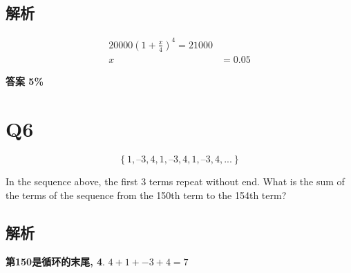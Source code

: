   \subsection{解析}

    \begin{align*}
      20000 \left( 1 + \frac{x}{4} \right)^{4} = 21000 \\
      x &= 0.05
    \end{align*}

    \textbf{答案 5\%}

\section{Q6}

  \begin{equation*}
    \left\{1, –3, 4, 1, –3, 4, 1, –3, 4, ...\right\}
  \end{equation*}

  In the sequence above, the first 3 terms repeat without end. What is the
  sum of the terms of the sequence from the 150th term to the 154th term?

  \subsection{解析}

    \textbf{第150是循环的末尾, 4}. $ 4 + 1 + -3 + 4 = 7 $
